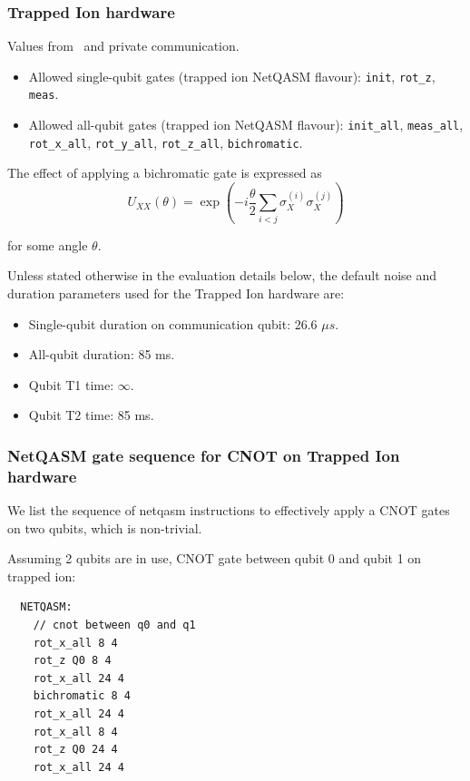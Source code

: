 \subsubsection{Trapped Ion hardware}
Values from~\cite{avis2023requirements} and private communication.

\begin{itemize}
  \item Allowed single-qubit gates (trapped ion NetQASM flavour): \texttt{init}, \texttt{rot\_z}, \texttt{meas}.
  \item Allowed all-qubit gates (trapped ion NetQASM flavour): \texttt{init\_all}, \texttt{meas\_all}, \texttt{rot\_x\_all}, \texttt{rot\_y\_all}, \texttt{rot\_z\_all}, \texttt{bichromatic}.
\end{itemize}


The effect of applying a bichromatic gate is expressed as
\[
   U_{XX}(\theta) = \exp(-i \frac{\theta}{2} \sum_{i<j} \sigma_X^{(i)} \sigma_X^{(j)})
\]

for some angle $\theta$.

Unless stated otherwise in the evaluation details below, the default noise and duration parameters used for the Trapped Ion hardware are:
\begin{itemize}
  \item Single-qubit duration on communication qubit: 26.6 $\mu s$.
  \item All-qubit duration: 85 ms.
  \item Qubit T1 time: $\infty$.
  \item Qubit T2 time: 85 ms.
\end{itemize}

\subsubsection{NetQASM gate sequence for CNOT on Trapped Ion hardware}
We list the sequence of netqasm instructions to effectively apply a CNOT gates on two qubits, which is non-trivial.

Assuming 2 qubits are in use, CNOT gate between qubit 0 and qubit 1 on trapped ion:
\begin{lstlisting}
  NETQASM:
    // cnot between q0 and q1
    rot_x_all 8 4
    rot_z Q0 8 4
    rot_x_all 24 4
    bichromatic 8 4
    rot_x_all 24 4
    rot_x_all 8 4
    rot_z Q0 24 4
    rot_x_all 24 4
\end{lstlisting}

